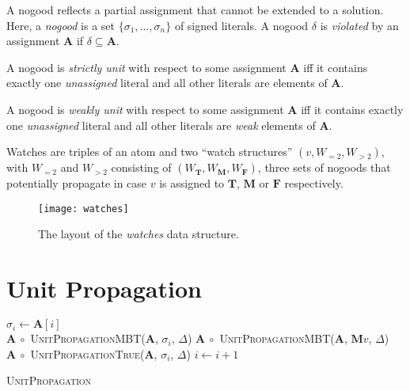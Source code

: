 \documentclass{vutinfth} %
\begin{document}
A nogood reflects a partial assignment that cannot be extended to a solution. Here, a \emph{nogood} is a set $\{ \sigma_1, \ldots, \sigma_n \}$ of signed literals. A nogood $\delta$ is \emph{violated} by an assignment $\mathbf{A}$ if $\delta \subseteq \mathbf{A}$.

A nogood is \emph{strictly unit} with respect to some assignment $\mathbf{A}$ iff it contains exactly one \emph{unassigned} literal and all other literals are elements of $\mathbf{A}$.

A nogood is \emph{weakly unit} with respect to some assignment $\mathbf{A}$ iff it contains exactly one \emph{unassigned} literal and all other literals are \emph{weak} elements of $\mathbf{A}$.


Watches are triples of an atom and two \enquote{watch structures} $(v, W_{=2}, W_{>2})$, with $W_{=2}$ and $W_{>2}$ consisting of $(W_\mathbf{T}, W_\mathbf{M}, W_\mathbf{F})$,  three sets of nogoods that potentially propagate in case $v$ is assigned to $\mathbf{T}$, $\mathbf{M}$ or $\mathbf{F}$ respectively.

\begin{figure}[h]
  \centering
  \texttt{[image: watches]}
  \caption{The layout of the \emph{watches} data structure.}
  \label{fig:watches} %
\end{figure}

\section{Unit Propagation}

\begin{algorithm}
  {
    $\sigma_i \leftarrow \mathbf{A}[i]$\\
    {
      $\mathbf{A} \ \circ$ \textsc{UnitPropagationMBT}($\mathbf{A}$, $\sigma_i$, $\Delta$)
    }
    \Else
    {
      $\mathbf{A} \ \circ$ \textsc{UnitPropagationMBT}($\mathbf{A}$, $\mathbf{M}v$, $\Delta$)\\
      $\mathbf{A} \ \circ$ \textsc{UnitPropagationTrue}($\mathbf{A}$, $\sigma_i$, $\Delta$)
    }
    $i \leftarrow i + 1$
  }
  \caption{\textsc{UnitPropagation}}
  \label{alg:prop}
\end{algorithm}
\end{document}

